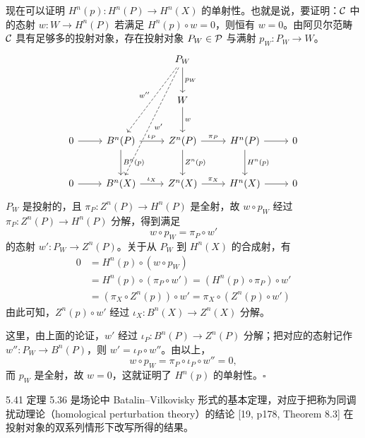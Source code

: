 现在可以证明 $H^n(p)\colon H^n(P)\to H^n(X)$ 的单射性。也就是说，要证明：$\mathcal{C}$ 中的态射 $w\colon W\to H^n(P)$ 若满足 $H^n(p)\circ w=0$，则恒有 $w=0$。由阿贝尔范畴 $\mathcal{C}$ 具有足够多的投射对象，存在投射对象 $P_W\in\mathcal{P}$ 与满射 $p_W\colon P_W\to W$。
\[\begin{tikzcd}[row sep=2.6em, column sep=2.4em]
 & & P_W \arrow[ddl,dashed,"w''"'] \arrow[dddl,dashed,"w'"] \arrow[d,"p_W"] & & \\
 & & W \arrow[d,"w"] & & \\
0 \arrow[r] & B^n(P) \arrow[r,"\iota_P"] \arrow[d,"B^n(p)"] & Z^n(P) \arrow[r,"\pi_P"] \arrow[d,"Z^n(p)"] & H^n(P) \arrow[r] \arrow[d,"H^n(p)"] & 0\\
0 \arrow[r] & B^n(X) \arrow[r,"\iota_X"] & Z^n(X) \arrow[r,"\pi_X"] & H^n(X) \arrow[r] & 0
\end{tikzcd}\]
$P_W$ 是投射的，且 $\pi_P\colon Z^n(P)\to H^n(P)$ 是全射，故 $w\circ p_W$
经过 $\pi_P\colon Z^n(P)\to H^n(P)$ 分解，得到满足
\[
  w\circ p_W=\pi_P\circ w'
\]
的态射 $w'\colon P_W\to Z^n(P)$。关于从 $P_W$ 到 $H^n(X)$ 的合成射，有
\begin{align*}
  0 &= H^n(p)\circ(w\circ p_W)\\
    &= H^n(p)\circ(\pi_P\circ w')=(H^n(p)\circ\pi_P)\circ w'\\
    &= (\pi_X\circ Z^n(p))\circ w'=\pi_X\circ(Z^n(p)\circ w')
\end{align*}
由此可知，$Z^n(p)\circ w'$ 经过 $\iota_X\colon B^n(X)\to Z^n(X)$ 分解。

这里，由上面的论证，$w'$ 经过 $\iota_P\colon B^n(P)\to Z^n(P)$ 分解；把对应的态射记作 $w''\colon P_W\to B^n(P)$，则 $w'=\iota_P\circ w''$。由以上，
\[
  w\circ p_W=\pi_P\circ\iota_P\circ w''=0,
\]
而 $p_W$ 是全射，故 $w=0$，这就证明了 $H^n(p)$ 的单射性。\hfill$\square$


\begin{remark}{5.41}
定理 5.36 是场论中 Batalin–Vilkovisky 形式的基本定理，对应于把称为同调扰动理论（homological perturbation theory）的结论 [19, p178, Theorem 8.3] 在投射对象的双系列情形下改写所得的结果。
\end{remark}

